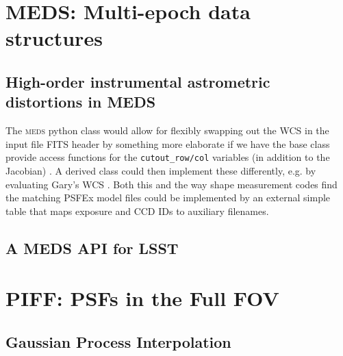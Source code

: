 \documentclass[\docopts]{\docclass}
\begin{document}

\section{MEDS: Multi-epoch data structures}


\subsection{High-order instrumental astrometric distortions in MEDS}


The \textsc{meds} python class would allow for flexibly swapping out the WCS in the input file FITS header by something more elaborate if we have the base class provide access functions for the \texttt{cutout\_row/col} variables (in addition to the Jacobian) . A derived class could then implement these differently, e.g. by evaluating Gary's WCS . Both this and the way shape measurement codes find the matching PSFEx model files could be implemented by an external simple table that maps exposure and CCD IDs to auxiliary filenames.


\subsection{A MEDS API for LSST}



\section{PIFF: PSFs in the Full FOV}


\subsection{Gaussian Process Interpolation}
\end{document}
